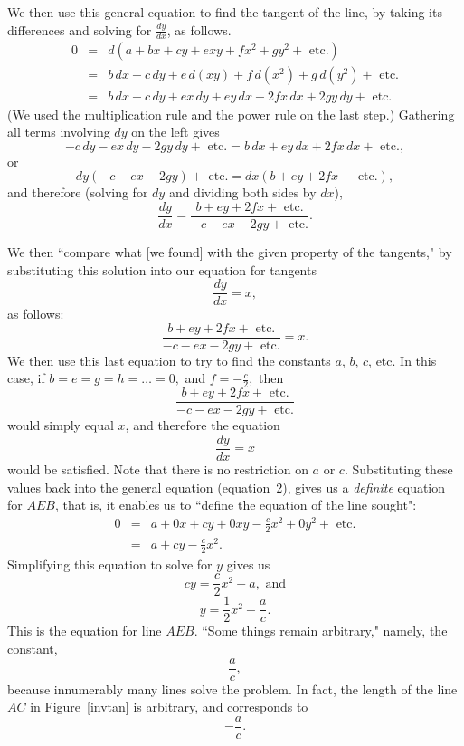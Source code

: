 \documentclass[polutonikogreek,english,twoside,openright]{article}
\begin{document}
 We then use this general equation to find the tangent of the line, by
 taking its differences and solving for
$\frac{dy}{dx}$, as follows.
\begin{eqnarray*}
0 & = & d(a + bx + cy + exy + fx^2 + gy^2 + \mbox{ etc.}) \\
& = & b\,dx + c\,dy + e\,d(xy) + f\,d(x^2) + g\,d(y^2) +\mbox{ etc.}\\
& = & b\,dx + c\,dy + ex\,dy + ey\,dx + 2fx\,dx + 2gy\,dy + \mbox{ etc.}
\end{eqnarray*}
(We used the multiplication rule and the power rule on the last step.)
Gathering all terms involving $dy$ on the left gives
$$ - c\,dy -ex\,dy - 2gy\,dy + \mbox{ etc.} = b\,dx + ey\,dx + 2fx\,dx +\mbox{ etc.},$$
or
$$dy( - c -ex - 2gy) + \mbox{ etc.} = dx(b + ey + 2fx +\mbox{ etc.}),$$
and therefore (solving for $dy$ and dividing both sides by $dx$),
$$\frac{dy}{dx} = \frac{b + ey + 2fx +\mbox{ etc.}}{- c - ex - 2gy +\mbox{ etc.}}.$$

We then ``compare what [we found] with the given property of the
tangents," by substituting this solution into our equation for
tangents
$$\frac{dy}{dx} = x,$$
as follows:
$$ \frac{b + ey + 2fx +\mbox{ etc.}}{- c - ex - 2gy +\mbox{ etc.}} = x.$$
We then use this last equation to try to find the constants $a$,
$b$, $c$, etc.
In this case, if
$b = e = g = h = \ldots = 0,$ and  $f = -\frac{c}{2},$ then 
$$\frac{b + ey + 2fx +\mbox{ etc.}}{- c - ex - 2gy +\mbox{ etc.}}$$
would simply equal $x$, and therefore the equation 
$$\frac{dy}{dx} =x$$ 
would be satisfied.
Note that there is no restriction on $a$ or $c$.  Substituting these
values back into the general equation (equation~2), gives us a {\em
  definite} equation for $AEB$, that is, it enables us to ``define the
equation of the line sought":
\begin{eqnarray*}
  0 & = & a + 0x + cy + 0xy - \frac{c}{2}x^2 + 0y^2 + \mbox{ etc.}\\
    & = & a + cy - \frac{c}{2}x^2.
\end{eqnarray*}
Simplifying this equation to solve for $y$ gives us
$$cy  =  \frac{c}{2}x^2 - a,\mbox{ and}$$
\begin{equation}
y  =  \frac{1}{2}x^2 - \frac{a}{c}.
\end{equation}
This is the equation for line $AEB$.  ``Some things remain arbitrary," namely, the constant, 
$$\frac{a}{c},$$
because innumerably many lines solve the problem.  In fact, the length
of the line $AC$ in Figure~\ref{invtan} is arbitrary, and corresponds
to
$$-\frac{a}{c}.$$
\setcounter{equation}{0}
\end{document}
